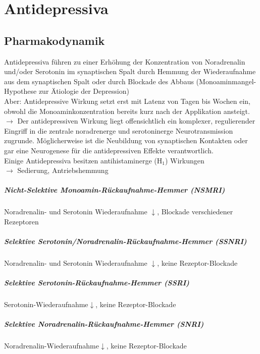\documentclass[10pt,a4paper]{report}
\begin{document}
\chapter{Antidepressiva} %
\label{cha:antidepressiva}
\section{Pharmakodynamik} %
\label{sec:pharmakodynamik}
Antidepressiva führen zu einer Erhöhung der Konzentration von Noradrenalin und/oder Serotonin im synaptischen Spalt durch Hemmung der Wiederaufnahme aus dem synaptischen Spalt oder durch Blockade des Abbaus	(Monoaminmangel-Hypothese zur Ätiologie der Depression)\\
Aber: Antidepressive Wirkung setzt erst mit Latenz von Tagen bis Wochen ein, obwohl die Monoaminkonzentration bereits kurz nach der Applikation ansteigt.\\
$\rightarrow$ Der antidepressiven Wirkung liegt offensichtlich ein komplexer, regulierender Eingriff in die zentrale noradrenerge und serotoninerge Neurotransmission 	zugrunde. Möglicherweise ist die Neubildung von synaptischen Kontakten   oder gar eine Neurogenese für die antidepressiven Effekte verantwortlich.\\
Einige Antidepressiva besitzen antihistaminerge (H$_1$) Wirkungen\\
$\rightarrow$ Sedierung, Antriebshemmung
\paragraph{Nicht-Selektive Monoamin-Rückaufnahme-Hemmer (NSMRI)}
Noradrenalin- und Serotonin Wiederaufnahme $\downarrow$, Blockade verschiedener Rezeptoren
\paragraph{Selektive Serotonin/Noradrenalin-Rückaufnahme-Hemmer (SSNRI)}
Noradrenalin- und Serotonin Wiederaufnahme $\downarrow$, keine Rezeptor-Blockade
\paragraph{Selektive Serotonin-Rückaufnahme-Hemmer (SSRI)}
Serotonin-Wiederaufnahme$\downarrow$, keine Rezeptor-Blockade 
\paragraph{Selektive Noradrenalin-Rückaufnahme-Hemmer (SNRI)}
Noradrenalin-Wiederaufnahme$\downarrow$, keine Rezeptor-Blockade 
\end{document}
